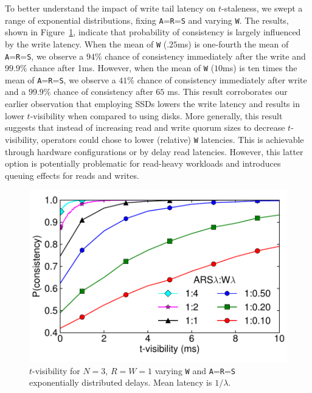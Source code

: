 \documentclass{vldb}
\begin{document}
To better understand the impact of write tail latency on
$t$-staleness, we swept a range of exponential distributions, fixing
\texttt{A}=\texttt{R}=\texttt{S} and varying \texttt{W}.  The results,
shown in Figure~\ref{fig:varydelay}, indicate that probability of
consistency is largely influenced by the write latency. When the mean
of \texttt{W} ($.25$ms) is one-fourth the mean of
\texttt{A}=\texttt{R}=\texttt{S}, we observe a $94\%$ chance of
consistency immediately after the write and $99.9\%$ chance after 1ms.
However, when the mean of \texttt{W} ($10$ms) is ten times the mean of
\texttt{A}=\texttt{R}=\texttt{S}, we observe a $41\%$ chance of
consistency immediately after write and a $99.9\%$ chance of
consistency after $65$ ms. This result corroborates our earlier
observation that employing SSDs lowers the write latency and results
in lower $t$-visibility when compared to using disks.  More generally,
this result suggests that instead of increasing read and write quorum
sizes to decrease $t$-visibility, operators could chose to lower
(relative) \texttt{W} latencies.  This is achievable through hardware
configurations or by delay read latencies.  However, this latter
option is potentially problematic for read-heavy workloads and
introduces queuing effects for reads and writes.

\begin{figure}
\centering
\includegraphics[width=.85\columnwidth]{figs/rwratio.pdf}
\vspace{-8pt}
\caption{$t$-visibility for $N$$=$$3$, $R$$=$$W$$=$$1$ varying \texttt{W} and \texttt{A}=\texttt{R}=\texttt{S} exponentially distributed delays.  Mean latency is $1/\lambda$.}
\vspace{-12pt}
\label{fig:varydelay}
\end{figure}
\end{document}
